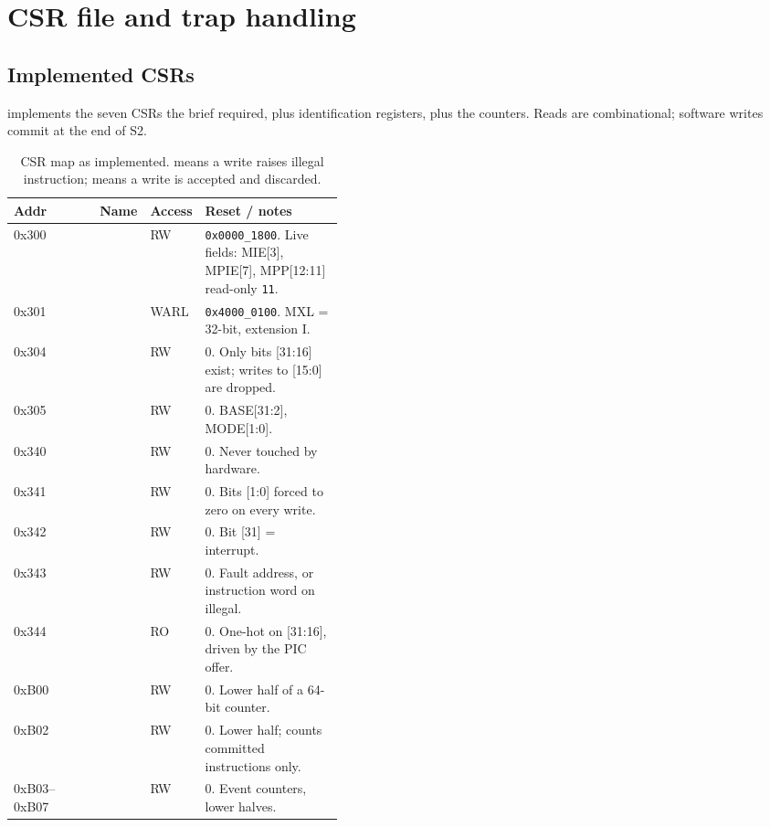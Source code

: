 \chapter{CSR file and trap handling}
\label{ch:csr}

\section{Implemented CSRs}

 implements the seven CSRs the brief required, plus
identification registers, plus the counters. Reads are combinational; software
writes commit at the end of S2.

\begin{table}[H]
\centering
\caption{CSR map as implemented.  means a write raises illegal
instruction;  means a write is accepted and discarded.}
\label{tab:csrmap}
\begin{tabular}{@{}TllL{0.42\linewidth}@{}}
\toprule
\textnormal{\textbf{Addr}} & \textbf{Name} & \textbf{Access} & \textbf{Reset / notes} \\
\midrule
0x300 &    & RW & \texttt{0x0000\_1800}. Live fields: MIE[3], MPIE[7], MPP[12:11] read-only \texttt{11}. \\
0x301 &       & WARL & \texttt{0x4000\_0100}. MXL = 32-bit, extension I. \\
0x304 &        & RW & 0. Only bits [31:16] exist; writes to [15:0] are dropped. \\
0x305 &      & RW & 0. BASE[31:2], MODE[1:0]. \\
0x340 &   & RW & 0. Never touched by hardware. \\
0x341 &       & RW & 0. Bits [1:0] forced to zero on every write. \\
0x342 &     & RW & 0. Bit [31] = interrupt. \\
0x343 &      & RW & 0. Fault address, or instruction word on illegal. \\
0x344 &        & RO & 0. One-hot on [31:16], driven by the PIC offer. \\
0xB00 &     & RW & 0. Lower half of a 64-bit counter. \\
0xB02 &   & RW & 0. Lower half; counts committed instructions only. \\
0xB03--0xB07 &  & RW & 0. Event counters, lower halves. \\

\end{tabular}
\end{table}
